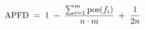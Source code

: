 \documentclass[preview]{standalone}
\begin{document}
\begin{align*}
\special{dvisvgm:raw <g id='unique000'>}\mathrm{APFD} \;=\; 1 \;-\; \frac{\sum_{i=1}^{m} \mathrm{pos}(f_i)}{n \cdot m} \;+\; \frac{1}{2n}\special{dvisvgm:raw </g>}
\end{align*}
\end{document}
